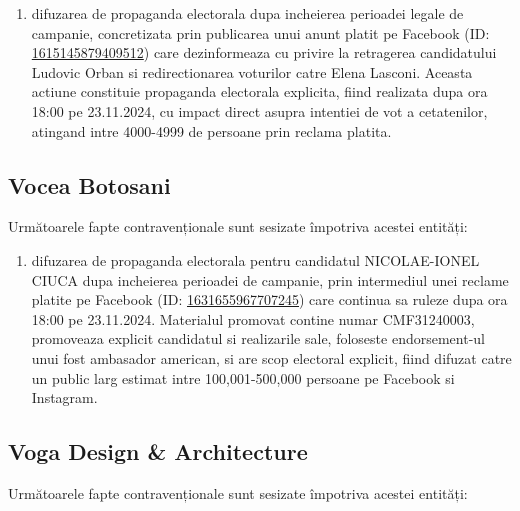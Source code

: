 \documentclass[a4paper,12pt]{article}
\begin{document}
\begin{enumerate}[leftmargin=*, label=\arabic*.)]
    \item difuzarea de propaganda electorala dupa incheierea perioadei legale de campanie, concretizata prin publicarea unui anunt platit pe Facebook (ID: \href{https://www.facebook.com/ads/library/?id=1615145879409512}{1615145879409512}) care dezinformeaza cu privire la retragerea candidatului Ludovic Orban si redirectionarea voturilor catre Elena Lasconi. Aceasta actiune constituie propaganda electorala explicita, fiind realizata dupa ora 18:00 pe 23.11.2024, cu impact direct asupra intentiei de vot a cetatenilor, atingand intre 4000-4999 de persoane prin reclama platita.
\end{enumerate}

\vspace{0.5cm}

\subsection{Vocea Botosani}
Următoarele fapte contravenționale sunt sesizate împotriva acestei entități:

\begin{enumerate}[leftmargin=*, label=\arabic*.)]
    \item difuzarea de propaganda electorala pentru candidatul NICOLAE-IONEL CIUCA dupa incheierea perioadei de campanie, prin intermediul unei reclame platite pe Facebook (ID: \href{https://www.facebook.com/ads/library/?id=1631655967707245}{1631655967707245}) care continua sa ruleze dupa ora 18:00 pe 23.11.2024. Materialul promovat contine numar CMF31240003, promoveaza explicit candidatul si realizarile sale, foloseste endorsement-ul unui fost ambasador american, si are scop electoral explicit, fiind difuzat catre un public larg estimat intre 100,001-500,000 persoane pe Facebook si Instagram.
\end{enumerate}

\vspace{0.5cm}

\subsection{Voga Design \& Architecture}
Următoarele fapte contravenționale sunt sesizate împotriva acestei entități:
\end{document}
